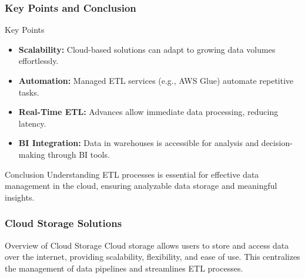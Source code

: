 \documentclass[aspectratio=169]{beamer}
\begin{document}
\begin{frame}[fragile]
    \frametitle{Key Points and Conclusion}
    \begin{block}{Key Points}
        \begin{itemize}
            \item \textbf{Scalability:} Cloud-based solutions can adapt to growing data volumes effortlessly.
            \item \textbf{Automation:} Managed ETL services (e.g., AWS Glue) automate repetitive tasks.
            \item \textbf{Real-Time ETL:} Advances allow immediate data processing, reducing latency.
            \item \textbf{BI Integration:} Data in warehouses is accessible for analysis and decision-making through BI tools.
        \end{itemize}
    \end{block}
    
    \begin{block}{Conclusion}
        Understanding ETL processes is essential for effective data management in the cloud, ensuring analyzable data storage and meaningful insights.
    \end{block}
\end{frame}

\begin{frame}
    \frametitle{Cloud Storage Solutions}
    \begin{block}{Overview of Cloud Storage}
        Cloud storage allows users to store and access data over the internet, providing scalability, flexibility, and ease of use. This centralizes the management of data pipelines and streamlines ETL processes.
    \end{block}
\end{frame}
\end{document}
